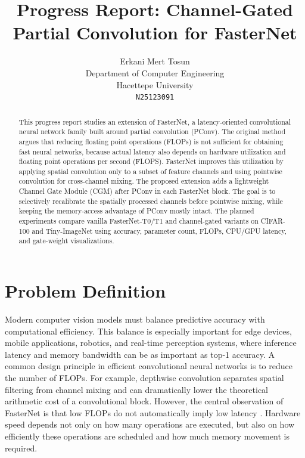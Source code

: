 \documentclass{article}
\title{Progress Report: Channel-Gated Partial Convolution for FasterNet}
\author{
Erkani Mert Tosun \\
Department of Computer Engineering \\
Hacettepe University \\
\texttt{N25123091}
}
\begin{document}
\maketitle

\begin{abstract}
This progress report studies an extension of FasterNet, a latency-oriented convolutional neural network family built around partial convolution (PConv). The original method argues that reducing floating point operations (FLOPs) is not sufficient for obtaining fast neural networks, because actual latency also depends on hardware utilization and floating point operations per second (FLOPS). FasterNet improves this utilization by applying spatial convolution only to a subset of feature channels and using pointwise convolution for cross-channel mixing. The proposed extension adds a lightweight Channel Gate Module (CGM) after PConv in each FasterNet block. The goal is to selectively recalibrate the spatially processed channels before pointwise mixing, while keeping the memory-access advantage of PConv mostly intact. The planned experiments compare vanilla FasterNet-T0/T1 and channel-gated variants on CIFAR-100 and Tiny-ImageNet using accuracy, parameter count, FLOPs, CPU/GPU latency, and gate-weight visualizations.
\end{abstract}

\section{Problem Definition}

Modern computer vision models must balance predictive accuracy with computational efficiency. This balance is especially important for edge devices, mobile applications, robotics, and real-time perception systems, where inference latency and memory bandwidth can be as important as top-1 accuracy. A common design principle in efficient convolutional neural networks is to reduce the number of FLOPs. For example, depthwise convolution separates spatial filtering from channel mixing and can dramatically lower the theoretical arithmetic cost of a convolutional block. However, the central observation of FasterNet is that low FLOPs do not automatically imply low latency \citep{chen2023fasternet}. Hardware speed depends not only on how many operations are executed, but also on how efficiently these operations are scheduled and how much memory movement is required.
\end{document}
